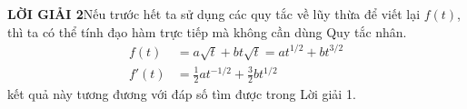\begin{minipage}[t]{0.70\textwidth}
    \vspace{1mm}
    \textbf{\textsf{\color{stewartcyan}LỜI GIẢI 2}}\quad Nếu trước hết ta sử dụng các quy tắc về lũy thừa để viết lại $f(t)$, thì ta có thể tính đạo hàm trực tiếp mà không cần dùng Quy tắc nhân.
    \begin{align*}
    f(t) &= a\sqrt{t} + bt\sqrt{t} = at^{1/2} + bt^{3/2} \\[1.5mm]
    f'(t) &= \frac{1}{2}at^{-1/2} + \frac{3}{2}bt^{1/2}
    \end{align*}
    kết quả này tương đương với đáp số tìm được trong Lời giải 1.\hfill{\color{stewartcyan}\blacksquare}
\end{minipage}
